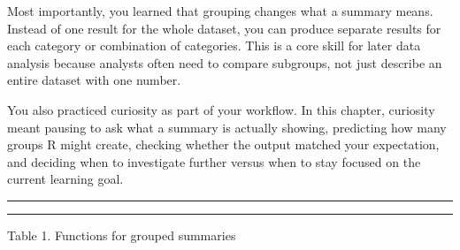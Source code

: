\documentclass[
]{article}
\begin{document}
Most importantly, you learned that grouping changes what a summary
means. Instead of one result for the whole dataset, you can produce
separate results for each category or combination of categories. This is
a core skill for later data analysis because analysts often need to
compare subgroups, not just describe an entire dataset with one number.

You also practiced curiosity as part of your workflow. In this chapter,
curiosity meant pausing to ask what a summary is actually showing,
predicting how many groups R might create, checking whether the output
matched your expectation, and deciding when to investigate further
versus when to stay focused on the current learning goal.

\begin{center}\rule{0.5\linewidth}{0.5pt}\end{center}

\begin{center}\rule{0.5\linewidth}{0.5pt}\end{center}

Table 1. Functions for grouped summaries
\end{document}
